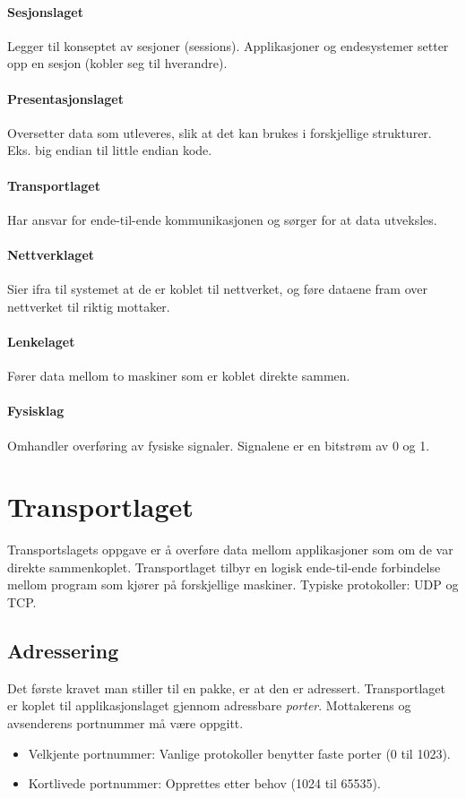 \documentclass[11pt,a4paper]{article}
\begin{document}
\paragraph{Sesjonslaget} 
Legger til konseptet av sesjoner (sessions). Applikasjoner og endesystemer setter opp en sesjon (kobler seg til hverandre). 

\paragraph{Presentasjonslaget}
Oversetter data som utleveres, slik at det kan brukes i forskjellige strukturer. Eks. big endian til little endian kode.

\paragraph{Transportlaget}
Har ansvar for ende-til-ende kommunikasjonen og sørger for at data utveksles.

\paragraph{Nettverklaget}
Sier ifra til systemet at de er koblet til nettverket, og føre dataene fram over nettverket til riktig mottaker.

\paragraph{Lenkelaget}
Fører data mellom to maskiner som er koblet direkte sammen.

\paragraph{Fysisklag}
Omhandler overføring av fysiske signaler. Signalene er en bitstrøm av 0 og 1.

\section{Transportlaget}
Transportslagets oppgave er å overføre data mellom applikasjoner som om de var direkte sammenkoplet. Transportlaget tilbyr en logisk ende-til-ende forbindelse mellom program som kjører på forskjellige maskiner. Typiske protokoller: UDP og TCP.

\subsection{Adressering}
Det første kravet man stiller til en pakke, er at den er adressert. Transportlaget er koplet til applikasjonslaget gjennom adressbare \textit{porter}. Mottakerens og avsenderens portnummer må være oppgitt. 
\begin{itemize}
\item{Velkjente portnummer: Vanlige protokoller benytter faste porter (0 til 1023).}
\item{Kortlivede portnummer: Opprettes etter behov (1024 til 65535).}
\end{itemize}
\end{document}
